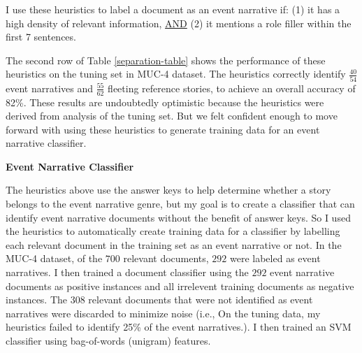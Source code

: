 

I use these heuristics to label a document as an event
narrative if: (1) it has a high density of relevant information, \underline{AND} (2)
it mentions a role filler within the first 7 sentences.

The second row of Table \ref{separation-table} shows the performance
of these heuristics on the tuning set in MUC-4 dataset. The heuristics correctly
identify $\frac{40}{54}$ event narratives and $\frac{55}{62}$ fleeting
reference stories, to achieve an overall accuracy of 82\%. These
results are undoubtedly optimistic because the heuristics were derived
from analysis of the tuning set. But we felt confident enough to move
forward with using these heuristics to generate training data for
an event narrative classifier.


\vspace{.1in}
{\bf Event Narrative Classifier}
\label{ssec:event-narrative-train}
\vspace{.1in}


The heuristics above use the answer keys to help determine whether a
story belongs to the event narrative genre, but my goal is to create
a classifier that can identify event narrative documents without the
benefit of answer keys. So I used the heuristics to automatically
create training data for a classifier by labelling each relevant
document in the training set as an event narrative or not.
In the MUC-4 dataset, of the $700$ relevant documents, $292$ were
labeled as event narratives. I then trained a document classifier
using the $292$ event narrative documents as positive instances and
all irrelevent training documents as negative instances. The $308$
relevant documents that were not identified as event narratives were
discarded to minimize noise (i.e., 
On the tuning data, my heuristics failed to identify 25\% of the event narratives.).
I then trained an SVM classifier using bag-of-words (unigram)
features.


